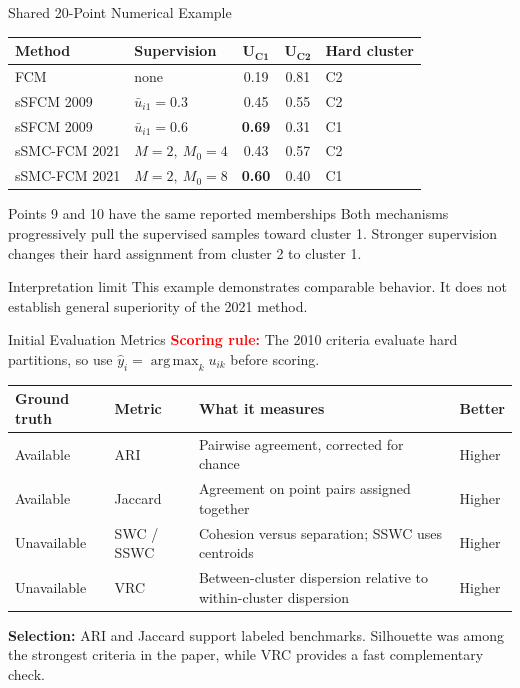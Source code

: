 \documentclass[t,aspectratio=169]{beamer}
\begin{document}
\begin{frame}{Shared 20-Point Numerical Example}
  \centering
  \small
  \setlength{\tabcolsep}{3pt}
  \renewcommand{\arraystretch}{1.22}
  \begin{tabular}{p{4.4cm}|p{3.1cm}|c|c|p{2.0cm}}
    \textbf{Method} & \textbf{Supervision} & $\boldsymbol{U_{C1}}$ & $\boldsymbol{U_{C2}}$ & \textbf{Hard cluster} \\
    \hline
    FCM & none & 0.19 & 0.81 & C2 \\
    sSFCM 2009 & $\bar u_{i1}=0.3$ & 0.45 & 0.55 & C2 \\
    sSFCM 2009 & $\bar u_{i1}=0.6$ & \textbf{0.69} & 0.31 & C1 \\
    sSMC-FCM 2021 & $M=2,\ M_0=4$ & 0.43 & 0.57 & C2 \\
    sSMC-FCM 2021 & $M=2,\ M_0=8$ & \textbf{0.60} & 0.40 & C1 \\
  \end{tabular}

  \vspace{0.6em}
  \begin{block}{Points 9 and 10 have the same reported memberships}
    Both mechanisms progressively pull the supervised samples toward cluster 1. Stronger supervision changes their hard assignment from cluster 2 to cluster 1.
  \end{block}
  \begin{alertblock}{Interpretation limit}
    This example demonstrates comparable behavior. It does not establish general superiority of the 2021 method.
  \end{alertblock}
\end{frame}

\begin{frame}{Initial Evaluation Metrics}
  \small
  \textbf{\textcolor{red}{Scoring rule:}} The 2010 criteria evaluate hard partitions, so use
  $\hat y_i=\operatorname*{arg\,max}_{k}u_{ik}$ before scoring.

  \vspace{0.35em}
  \centering
  \footnotesize
  \setlength{\tabcolsep}{3pt}
  \renewcommand{\arraystretch}{1.18}
  \begin{tabular}{p{2.25cm}|p{2.35cm}|p{6.2cm}|p{1.75cm}}
    \textbf{Ground truth} & \textbf{Metric} & \textbf{What it measures} & \textbf{Better} \\
    \hline
    Available & ARI & Pairwise agreement, corrected for chance & Higher \\
    Available & Jaccard & Agreement on point pairs assigned together & Higher \\
    Unavailable & SWC / SSWC & Cohesion versus separation; SSWC uses centroids & Higher \\
    Unavailable & VRC & Between-cluster dispersion relative to within-cluster dispersion & Higher \\
  \end{tabular}

  \vspace{0.45em}
  \raggedright
  \small
  \textbf{Selection:} ARI and Jaccard support labeled benchmarks. Silhouette was among the strongest criteria in the paper, while VRC provides a fast complementary check.
\end{frame}
\end{document}
